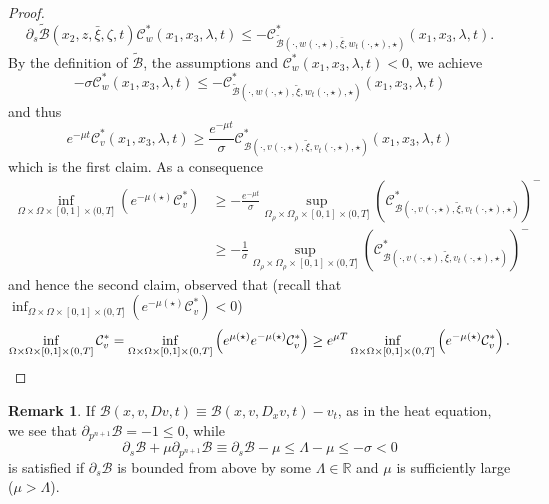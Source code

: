\documentclass[11pt, reqno]{amsart}
\theoremstyle{definition}
\newtheorem{remark}[lemma]{Remark}
\numberwithin{equation}{section}
\newcommand{\Btilde}{\widetilde{\mathscr{B}}}
\newcommand{\R}{\mathbb{R}}
\newcommand{\mc}[1]{\mathcal{#1}}
\begin{document}
\begin{proof}
\begin{equation*}
\partial_s \Btilde(x_2, z, \bar{\xi}, \zeta, t) \mc{C}^*_w(x_1,x_3,\lambda,t) \leq - \mc{C}^*_{\Btilde(\cdot, w(\cdot, \star), \bar{\xi}, w_t(\cdot, \star), \star)} (x_1, x_3, \lambda, t).
\end{equation*}
By the definition of $\Btilde$, the assumptions and $\mc{C}^*_w(x_1,x_3,\lambda,t) <0$, we achieve
\begin{equation}\label{eq_pre_negative}
-\sigma \mc{C}^*_w(x_1,x_3,\lambda,t) \leq - \mc{C}^*_{\Btilde(\cdot, w(\cdot, \star), \tilde{\xi}, w_t(\cdot, \star), \star)} (x_1, x_3, \lambda, t)
\end{equation}
and thus
$$ e^{-\mu t}\mc{C}^*_v(x_1,x_3,\lambda,t) \geq \frac{e^{-\mu t}}{\sigma} \mc{C}^*_{\mathscr{B}(\cdot, v(\cdot, \star), \tilde{\xi}, v_t(\cdot, \star), \star)} (x_1, x_3, \lambda, t)$$
which is the first claim. As a consequence
\begin{align*}
 \inf_{\Omega \times \Omega \times [0,1] \times (0,T]} \left( e^{-\mu (\star)}\mc{C}^*_v \right) 
 &\geq - \frac{e^{-\mu t}}{\sigma} \sup_{\Omega_{\rho} \times \Omega_{\rho} \times [0,1] \times (0,T]} \left(\mc{C}^*_{\mathscr{B}(\cdot, v(\cdot, \star), \tilde{\xi}, v_t(\cdot, \star), \star)}\right)^- \\
 &\geq - \frac{1}{\sigma} \sup_{\Omega_{\rho} \times \Omega_{\rho} \times [0,1] \times (0,T]} \left(\mc{C}^*_{\mathscr{B}(\cdot, v(\cdot, \star), \tilde{\xi}, v_t(\cdot, \star), \star)}\right)^-
 \end{align*}
 and hence the second claim, observed that (recall that $ \inf_{\Omega \times \Omega \times [0,1] \times (0,T]} \left( e^{-\mu (\star)}\mc{C}^*_v \right)<0$)
 \[ \inf_{\Omega \times \Omega \times [0,1] \times (0,T]} \mathcal{C}^*_v = \inf_{\Omega \times \Omega \times [0,1] \times (0,T]} \left( e^{\mu (\star)} e^{-\mu (\star)}\mathcal{C}^*_v\right) \geq e^{\mu T} \inf_{\Omega \times \Omega \times [0,1] \times (0,T]} \left(e^{-\mu (\star)}\mathcal{C}^*_v\right) . \qedhere \]
\end{proof}


\begin{remark}
If $\mathscr{B}(x,v,D v, t) \equiv \mathscr{B}(x,v,D_x v, t) - v_t$, as in the heat equation, we see that $\partial_{p^{n+1}} \mathscr{B} = - 1 \leq 0$, while 
$$\partial_s \mathscr{B} + \mu \partial_{p^{n+1}} \mathscr{B} \equiv \partial_s \mathscr{B} - \mu \leq \Lambda - \mu \leq -\sigma<0$$
is satisfied if $\partial_s \mathscr{B}$ is bounded from above by some $\Lambda \in \R$ and $\mu$ is sufficiently large ($\mu>\Lambda$).
\end{remark}
\end{document}
